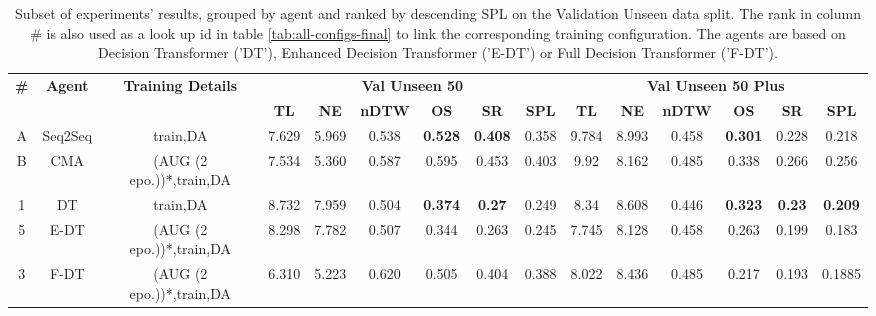 \begin{table}
\centering
\caption{\label{tab:best_seen_50}Subset of experiments' results, grouped by agent and ranked by descending SPL on the Validation Unseen data split. The rank in column \# is also used as a look up id in table \ref{tab:all-configs-final} to link the corresponding training configuration.     \newline The agents are based on Decision Transformer ('DT'), Enhanced Decision Transformer ('E-DT') or Full Decision Transformer ('F-DT').}
\begin{tabular}{@{\hskip3pt}c@{\hskip3pt}c@{\hskip3pt}c@{\hskip3pt}c@{\hskip3pt}c@{\hskip3pt}c@{\hskip3pt}c@{\hskip3pt}c@{\hskip3pt}c@{\hskip3pt}c@{\hskip3pt}c@{\hskip3pt}c@{\hskip3pt}c@{\hskip3pt}c@{\hskip3pt}c}
\toprule
\textbf{\#} & \textbf{Agent} & \textbf{Training Details} & \multicolumn{6}{c}{\textbf{Val Unseen 50}} & \multicolumn{6}{c}{\textbf{Val Unseen 50 Plus}} \\
 \textbf{~} &     \textbf{~} &                \textbf{~} &       \textbf{TL} &    \textbf{NE} &   \textbf{nDTW} &     \textbf{OS} &    \textbf{SR} &    \textbf{SPL} &         \textbf{TL} &     \textbf{NE} &   \textbf{nDTW} &     \textbf{OS} &    \textbf{SR} &    \textbf{SPL} \\
          A &             Seq2Seq &                  train,DA &             7.629 &          5.969 &           0.538 &  \textbf{ 0.528} &  \textbf{ 0.408} &           0.358 &                9.784 &           8.993 &           0.458 &  \textbf{0.301} &  0.228 &  0.218 \\
          B &           CMA &  (AUG (2 epo.))*,train,DA &             7.534 &          5.360 &           0.587 &           0.595 &          0.453 &           0.403 &               9.92 &           8.162 &           0.485 &           0.338 &          0.266 &           0.256 \\
\midrule
          1 &             DT &                  train,DA &             8.732 &          7.959 &           0.504 &  \textbf{0.374} &  \textbf{0.27} &           0.249 &                8.34 &           8.608 &           0.446 &  \textbf{0.323} &  \textbf{0.23} &  \textbf{0.209} \\
          5 &           E-DT &  (AUG (2 epo.))*,train,DA &             8.298 &          7.782 &           0.507 &           0.344 &          0.263 &           0.245 &               7.745 &           8.128 &           0.458 &           0.263 &          0.199 &           0.183 \\
          3 &           F-DT &  (AUG (2 epo.))*,train,DA &              6.310 &  5.223 &  0.620 &        0.505    &        0.404   &    0.388 &               8.022 &  8.436 &  0.485 &       0.217      &          0.193 &           0.1885 \\
\bottomrule
\end{tabular}
\end{table}
